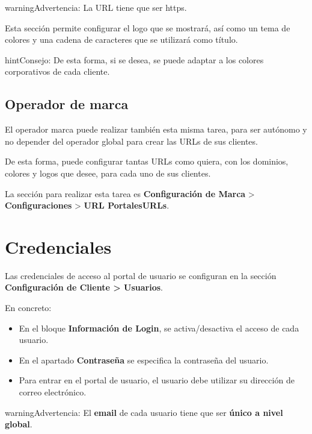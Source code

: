 \documentclass[letterpaper,10pt,spanish]{sphinxmanual}
\begin{document}
\begin{notice}{warning}{Advertencia:}
La URL tiene que ser https.
\end{notice}

Esta sección permite configurar el logo que se mostrará, así como un tema de colores y una cadena de caracteres que se utilizará como título.

\begin{notice}{hint}{Consejo:}
De esta forma, si se desea,  se puede adaptar a los colores corporativos de cada cliente.
\end{notice}


\subsection{Operador de marca}
\label{user_portal/urls:brand-operator}
El operador marca puede realizar también esta misma tarea, para ser autónomo y no depender del operador global para crear las URLs de sus clientes.

De esta forma, puede configurar tantas URLs como quiera, con los dominios, colores y logos que desee, para cada uno de sus clientes.

La sección para realizar esta tarea es \textbf{Configuración de Marca} \textgreater{} \textbf{Configuraciones} \textgreater{} \textbf{URL PortalesURLs}.


\section{Credenciales}
\label{user_portal/credentials:credentials}\label{user_portal/credentials::doc}
Las credenciales de acceso al portal de usuario se configuran en la sección \textbf{Configuración de Cliente \textgreater{} Usuarios}.

En concreto:
\begin{itemize}
\item {} 
En el bloque \textbf{Información de Login}, se activa/desactiva el acceso de cada usuario.

\item {} 
En el apartado \textbf{Contraseña} se especifica la contraseña del usuario.

\item {} 
Para entrar en el portal de usuario, el usuario debe utilizar su dirección de correo electrónico.

\end{itemize}

\begin{notice}{warning}{Advertencia:}
El \textbf{email} de cada usuario tiene que ser \textbf{único a nivel global}.
\end{notice}
\end{document}
